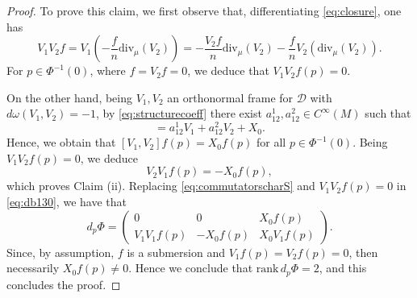 \documentclass[10pt,a4paper]{amsart}
\newcommand{\blue}{\color{blue}}
\newcommand{\diff}{d}%
\newcommand{\distr}{\mathcal{D}}								%
\begin{document}
\begin{proof}
\smallskip
To prove this claim, we first observe that,
differentiating \eqref{eq:closure}, one has
\begin{equation}
\label{eq:V_1V_2f}
V_1 V_2 f =  V_1 \left(-\frac{f}{n}\mathrm{div}_{\mu}(V_2)\right)=-\frac{V_2f}{n}\mathrm{div}_{\mu}(V_2)-\frac{f}{n}V_2\left(\mathrm{div}_{\mu}(V_2)\right).
\end{equation}
For $p\in  \Phi^{-1}(0)$, where $f=V_{2}f=0$, we deduce that $V_1V_2f(p)=0$.

On the other hand, being $V_1,V_2$ an orthonormal frame for $\distr$ with $\diff\omega(V_1,V_2)=-1$, by \eqref{eq:structurecoeff} there exist $a^1_{12},a^2_{12}\in C^\infty(M)$ such that 
\begin{equation}
[V_1,V_2]=a^1_{12}V_1+a^2_{12}V_2+X_0.
\end{equation}
Hence, we obtain that $[V_1,V_2]f(p)=X_0f(p)$ for all $p\in   \Phi^{-1}(0)$. 
Being $V_1V_2f(p)=0$, we deduce
\begin{equation}
\label{eq:commutatorscharS}
V_2V_1f(p)= -X_0f(p),%
\end{equation} 
which proves Claim (ii). Replacing \eqref{eq:commutatorscharS} and $V_1V_2f(p)=0$ in  \eqref{eq:db130}, we have that
\begin{equation}
\diff_p \Phi =
\left( \begin{array}{ccc}
0 & 0 &X_0f(p) \\
V_1V_1f(p) &   -X_0f(p)%
& X_0 V_1f(p)
\end{array} \right).
\end{equation}
Since, by assumption, $f$ is a submersion and $V_1f(p)=V_2f(p)=0$, then necessarily $X_0f(p)\neq 0$. Hence we conclude that $\mathrm{rank}\, \diff _p \Phi =2$, and this concludes the proof.
\end{proof}
\end{document}

